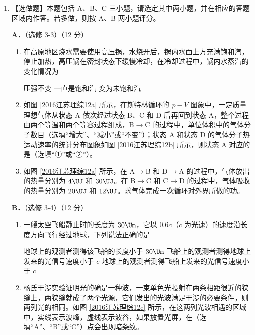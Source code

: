 \documentclass[\gkver]{gaokaozhenti}
\begin{document}
\begin{enumerate}
{（3）从实验结果看动能的变化量大于重力势能的变化量，如果是空气阻力的影响，则动能的变化量应小于重力势能的变化量，实验的差异应该是测量小球的速度时测量了小球下端的遮光条的速度，使得速度偏大，从而动能的变化量大于重力势能的变化量。

（4）尽量减小遮光条的尺寸可以减小误差。
}

\item
【选做题】本题包括 A、B、C 三小题，请选定其中两小题，并在相应的答题区域内作答。若多做，则按 A、B 两小题评分。

\textbf{A．}（选修 3-3）（12 分）

\begin{enumerate}
	\item
	在高原地区烧水需要使用高压锅，水烧开后，锅内水面上方充满饱和汽，停止加热，高压锅在密封状态下缓慢冷却，在冷却过程中，锅内水蒸汽的变化情况为

	{压强不变}
	{一直是饱和汽}
	{变为未饱和汽}
	\item
	如图 \ref{2016江苏理综12a} 所示，在斯特林循环的 $p-V$ 图象中，一定质量理想气体从状态 A 依次经过状态 B、C 和 D 后再回到状态 A，整个过程由两个等温和两个等容过程组成，B$\to$C 的过程中，单位体积中的气体分子数目（选填“增大”、“减小”或“不变”）；状态 A 和状态 D 的气体分子热运动速率的统计分布图象如图 \ref{2016江苏理综12b} 所示，则状态 A 对应的是（选填“①”或“②”）。

	\item
	如图 \ref{2016江苏理综12a} 所示，在 A$\to$B 和 D$\to$A 的过程中，气体放出的热量分别为 $4\UJ$ 和 $30\UJ$。在 B$\to$C 和 C$\to$D 的过程中，气体吸收的热量分别为 $20\UJ$ 和 $12\UJ$。求气体完成一次循环对外界所做的功。
\end{enumerate}

\textbf{B．}（选修 3-4）（12 分）

\begin{enumerate}
	\item
	一艘太空飞船静止时的长度为 $30\Um$，它以 $0.6c$（$c$ 为光速）的速度沿长度方向飞行经过地球，下列说法正确的是

	{地球上的观测者测得该飞船的长度小于 $30\Um$}
	{飞船上的观测者测得地球上发来的光信号速度小于 $c$}
	{地球上的观测者测得飞船上发来的光信号速度小于 $c$}
	\item
	杨氏干涉实验证明光的确是一种波，一束单色光投射在两条相距很近的狭缝上，两狭缝就成了两个光源，它们发出的光波满足干涉的必要条件，则两列光的相同。如图 \ref{2016江苏理综12c} 所示，在这两列光波相遇的区域中，实线表示波峰，虚线表示波谷，如果放置光屏，在（选填“A”、“B”或“C”）点会出现暗条纹。


\end{enumerate}
\end{enumerate}
\end{document}
